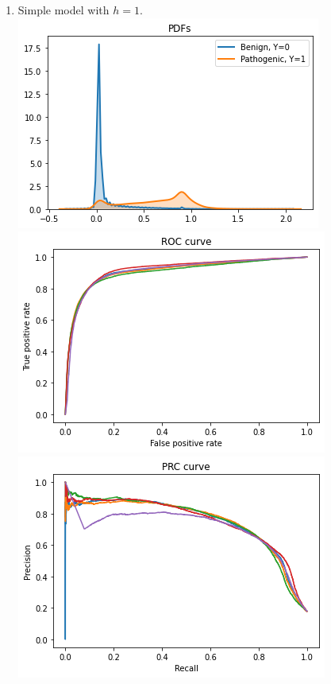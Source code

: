 \documentclass[twoside]{article}
\begin{document}
	\begin{enumerate}
		\item Simple model with $h = 1$.\\
		\includegraphics[scale=0.7]{res/img/s1pdf.png}\\
		\includegraphics[scale=0.7]{res/img/s1roc.png}\\
		\includegraphics[scale=0.7]{res/img/s1prc.png}\\


\end{enumerate}
\end{document}

